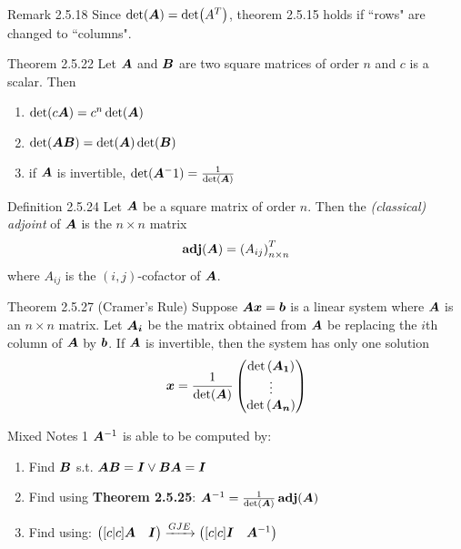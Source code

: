 \documentclass[10pt,portrait]{article}
\begin{document}
\begin{multicols}{2}
\begin{justifying}
\begin{namedthm*}{Remark 2.5.18}
	Since \(\det(\bm{A}) = \det(A^T)\), theorem 2.5.15 holds if ``rows" are changed to ``columns".
\end{namedthm*}

\begin{namedthm*}{Theorem 2.5.22}
	Let \(\bm{A}\) and \(\bm{B}\) are two square matrices of order \(n\) and \(c\) is a scalar. Then
	\begin{enumerate}
		\item \(\det(c\bm{A}) = c^n\det(\bm{A})\)
		\item \(\det(\bm{AB}) = \det(\bm{A})\det(\bm{B})\)
		\item if \(\bm{A}\) is invertible, \(\det(\bm{A}^-1) = \frac{1}{\det(\bm{A})}\)
	\end{enumerate}
\end{namedthm*}

\begin{namedthm*}{Definition 2.5.24}
	Let \(\bm{A}\) be a square matrix of order \(n\). Then the \textit{(classical) adjoint} of \(\bm{A}\) is the \(n \times n\) matrix
	\[
	\operatorname{\textbf{adj}}(\bm{A}) = \left(A_{ij}\right)_{n \times n}^T
	\]
	where \(A_{ij}\) is the \((i, j)\)-cofactor of \(\bm{A}\).
\end{namedthm*}

\begin{namedthm*}{Theorem 2.5.27 (Cramer's Rule)}
    Suppose \(\bm{A}\bm{x} = \bm{b}\) is a linear system where \(\bm{A}\) is an \(n \times n\) matrix. Let \(\bm{A_i}\) be the matrix obtained from \(\bm{A}\) be replacing the \(i\)th column of \(\bm{A}\) by \(\bm{b}\). If \(\bm{A}\) is invertible, then the system has only one solution
    \[
        \bm{x} = \frac{1}{\det(\bm{A})}\begin{pmatrix}\det\left(\bm{A_1}\right) \\ \vdots \\ \det\left(\bm{A_n}\right) \end{pmatrix}
    \]
\end{namedthm*}

\begin{namedthm*}{Mixed Notes 1}
	\(\bm{A}^{-1}\) is able to be computed by:
	\begin{enumerate}
		\item Find \(\bm{B}\) s.t. \(\bm{AB} = \bm{I} \lor \bm{BA} = \bm{I}\)
		\item Find using \textbf{Theorem 2.5.25}: \(\bm{A}^{-1} = \frac{1}{\det(\bm{A})}\operatorname{\textbf{adj}}(\bm{A})\)
		\item Find using: \(\begin{pmatrix}[c|c] \bm{A} & \bm{I}\end{pmatrix} \xrightarrow{GJE} \begin{pmatrix}[c|c] \bm{I} & \bm{A}^{-1}\end{pmatrix}\)
	\end{enumerate} 
\end{namedthm*}


\end{justifying}
\end{multicols}
\end{document}
